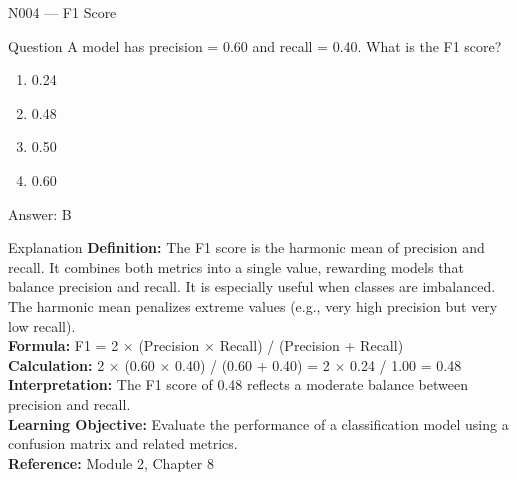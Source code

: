 \documentclass[aspectratio=169,8pt]{beamer}
\begin{document}
	\begin{frame}{N004 --- F1 Score}
		\begin{block}{Question}
			A model has precision = 0.60 and recall = 0.40. What is the F1 score?
			\begin{enumerate}
				\item 0.24
				\item 0.48
				\item 0.50
				\item 0.60
			\end{enumerate}
		\end{block}
		\begin{exampleblock}{Answer: B}\end{exampleblock}
		\begin{block}{Explanation}
			\textbf{Definition:} The F1 score is the harmonic mean of precision and recall. It combines both metrics into a single value, rewarding models that balance precision and recall. It is especially useful when classes are imbalanced. The harmonic mean penalizes extreme values (e.g., very high precision but very low recall).\\
			\textbf{Formula:} F1 = 2 $\times$ (Precision $\times$ Recall) / (Precision + Recall)\\
			\textbf{Calculation:} 2 $\times$ (0.60 $\times$ 0.40) / (0.60 + 0.40) = 2 $\times$ 0.24 / 1.00 = 0.48\\
			\textbf{Interpretation:} The F1 score of 0.48 reflects a moderate balance between precision and recall.\\
			\textbf{Learning Objective:} Evaluate the performance of a classification model using a confusion matrix and related metrics.\\
			\textbf{Reference:} Module 2, Chapter 8
		\end{block}
	\end{frame}
	
\end{document}
